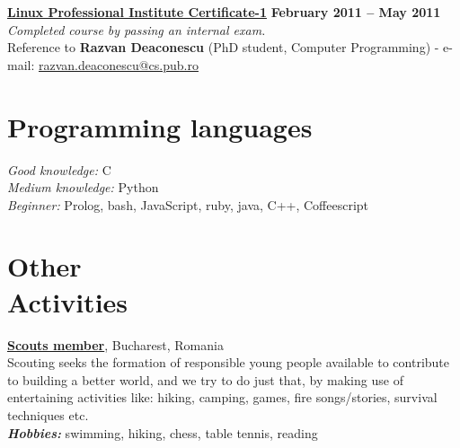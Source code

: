 \documentclass[margin,line]{resume}
\begin{document}
\begin{resume}

	\href{http://www.lpi.org/eng/certification/the\_lpic\_program/lpic\_1}{\textbf{Linux Professional Institute Certificate-1}}
		\hfill \textbf{February 2011 -- May 2011}\vspace{1.5mm}\\
	\vspace{1mm}\textit{Completed course by passing an internal exam.}\\
	\small{Reference to \textbf{Razvan Deaconescu} (PhD student, Computer Programming)
		- e-mail: \href{mailto:razvan.deaconescu@cs.pub.ro}{razvan.deaconescu@cs.pub.ro}}


    \section{\mysidestyle Programming languages} 
    \textit{Good knowledge:} C\\
	\textit{Medium knowledge:} Python\\
	\textit{Beginner:} Prolog, bash, JavaScript, ruby, java, C++, Coffeescript


    \section{\mysidestyle Other\\Activities}

	\vspace{1.2mm}\href{http://www.scoutpanaitescu.ro/}{\textbf{Scouts member}}, Bucharest, Romania\vspace{1mm}\\
	Scouting seeks the formation of responsible young people available to contribute to building a better world, and we try 
	to do just that, by making use of entertaining activities like: hiking, camping, games, fire songs/stories, survival 
	techniques etc.\vspace{1.5mm}\\
	\textbf{\textit{Hobbies:}} swimming, hiking, chess, table tennis, reading



\end{resume}
\end{document}

